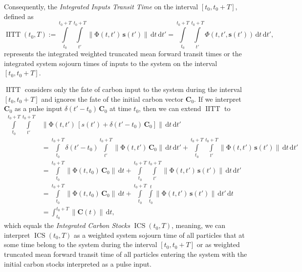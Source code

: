 \documentclass[9pt,twoside,lineno]{pnas-new_SI}
\newcommand{\IITT}{\operatorname{IITT}}
\newcommand{\ICS}{\operatorname{ICS}}
\newcommand{\intl}{\int\limits}
\newcommand{\dd}[1]{\,\mathrm{d}#1}
\renewcommand{\vec}[1]{\mathbf{#1}}
\newcommand{\tens}[1]{\mathrm{#1}}
\newcommand{\itPhi}{\mathit{\Phi}}
\newcommand{\vnorm}[1]{\left\|#1\right\|}
\begin{document}
Consequently, the \emph{Integrated Inputs Transit Time} on the interval $[t_0, t_0+T]$, defined as
\begin{equation}
    \label{eqn:IITT}
    \IITT(t_0, T) := \intl_{t_0}^{t_0+T} \intl_{t'}^{t_0+T} \vnorm{\tens{\Phi}(t,t')\,\vec{s}(t')}\dd{t}\dd{t'} = \intl_{t_0}^{t_0+T} \intl_{t'}^{t_0+T} \itPhi(t,t',\vec{s}(t'))\dd{t}\dd{t'},
\end{equation}
represents the integrated weighted truncated mean forward transit times or the integrated system sojourn times of inputs to the system on the interval $[t_0, t_0+T]$.

$\IITT$ considers only the fate of carbon input to the system during the interval $[t_0,t_0+T]$ and ignores the fate of the initial carbon vector $\vec{C}_0$.
If we interpret $\vec{C}_0$ as a pulse input $\delta(t'-t_0)\,\vec{C}_0$ at time $t_0$, then we can extend $\IITT$ to
\begin{equation}
    \label{eqn:ICS}
    \begin{aligned}
        \intl_{t_0}^{t_0+T} \intl_{t'}^{t_0+T} &\vnorm{\tens{\Phi}(t,t')\,\left[s(t') + \delta(t'-t_0)\,\vec{C}_0\right]}\dd{t}\dd{t'} \\
        &=\intl_{t_0}^{t_0+T} \delta(t'-t_0) \intl_{t'}^{t_0+T}\vnorm{\tens{\Phi}(t,t')\,\vec{C}_0}\dd{t}\dd{t'} + \intl_{t_0}^{t_0+T}\intl_{t'}^{t_0+T}\vnorm{\tens{\Phi}(t,t')\,\vec{s}(t')}\dd{t}\dd{t'}\\
        &= \intl_{t_0}^{t_0+T}\vnorm{\tens{\Phi}(t,t_0)\,\vec{C}_0}\dd{t} +\intl_{t_0}^{t_0+T}\intl_{t'}^{t_0+T}\vnorm{\tens{\Phi}(t,t')\,\vec{s}(t')}\dd{t}\dd{t'}\\
        & = \intl_{t_0}^{t_0+T}\vnorm{\tens{\Phi}(t,t_0)\,\vec{C}_0}\dd{t} + \intl_{t_0}^{t_0+T} \intl_{t_0}^t \vnorm{\tens{\Phi}(t,t')\,\vec{s}(t')}\dd{t'}\dd{t}\\
        &= \int_{t_0}^{t_0+T} \vnorm{\vec{C}(t)}\dd{t},
    \end{aligned}
\end{equation}
which equals the \emph{Integrated Carbon Stocks} $\ICS(t_0,T)$, meaning, we can interpret $\ICS(t_0, T)$ as a weighted system sojourn time of all particles that at some time belong to the system during the interval $[t_0,t_0+T]$ or as weighted truncated mean forward transit time of all particles entering the system with the initial carbon stocks interpreted as a pulse input.
\end{document}
